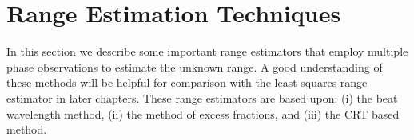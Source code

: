 \section{Range Estimation Techniques}\label{sec:ch2-range-estimation-techniques}
In this section we describe some important range estimators that employ multiple phase observations to estimate the unknown range.  A good understanding of these methods will be helpful for comparison with the least squares range estimator in later chapters. These range estimators are based upon: (i) the beat wavelength method, (ii) the method of excess fractions, and (iii) the CRT based method. %
